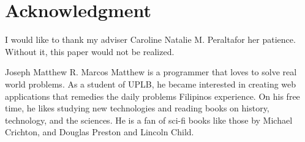\documentclass[journal]{./IEEE/IEEEtran}
\newcommand{\ADVISEE}{Joseph Matthew R. Marcos}
\newcommand{\ADVISER}{Caroline Natalie M. Peralta}
\begin{document}
\section*{Acknowledgment}
I would like to thank my adviser \ADVISER for her patience. Without it, this paper would not be realized.
\begin{biography}{\ADVISEE}
Matthew is a programmer that loves to solve real world problems. As a student of UPLB, he became interested in creating web applications that remedies the daily problems Filipinos experience. On his free time, he likes studying new technologies and reading books on history, technology, and the sciences. He is a fan of sci-fi books like those by Michael Crichton, and Douglas Preston and Lincoln Child.
\end{biography}


\newpage
% 



\newpage
\appendices
\end{document}
